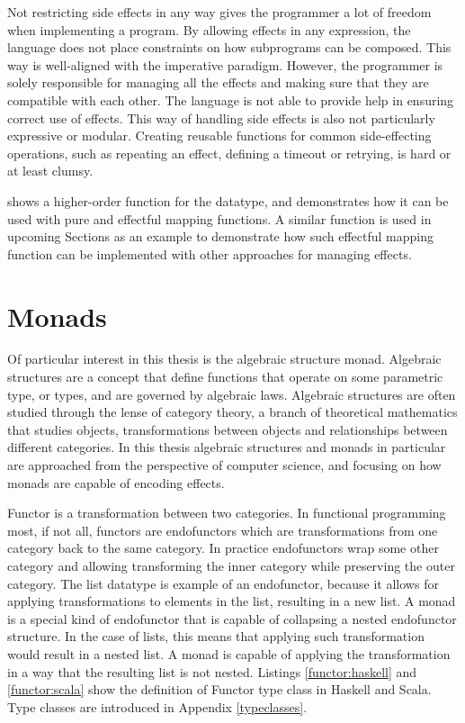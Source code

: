 Not restricting side effects in any way gives the programmer a lot of freedom when implementing a program. By allowing effects in any expression, the language does not place constraints on how subprograms can be composed. This way is well-aligned with the imperative paradigm. However, the programmer is solely responsible for managing all the effects and making sure that they are compatible with each other. The language is not able to provide help in ensuring correct use of effects. This way of handling side effects is also not particularly expressive or modular. Creating reusable functions for common side-effecting operations, such as repeating an effect, defining a timeout or retrying, is hard or at least clumsy.

 shows a higher-order function  for the  datatype, and demonstrates how it can be used with pure and effectful mapping functions. A similar function is used in upcoming Sections as an example to demonstrate how such effectful mapping function can be implemented with other approaches for managing effects.





\section{Monads} \label{monads}
Of particular interest in this thesis is the algebraic structure monad. Algebraic structures are a concept that define functions that operate on some parametric type, or types, and are governed by algebraic laws. Algebraic structures are often studied through the lense of category theory, a branch of theoretical mathematics that studies objects, transformations between objects and relationships between different categories. In this thesis algebraic structures and monads in particular are approached from the perspective of computer science, and focusing on how monads are capable of encoding effects.

Functor is a transformation between two categories. In functional programming most, if not all, functors are endofunctors which are transformations from one category back to the same category. In practice endofunctors wrap some other category and allowing transforming the inner category while preserving the outer category. The list datatype is example of an endofunctor, because it allows for applying transformations to elements in the list, resulting in a new list. A monad is a special kind of endofunctor that is capable of collapsing a nested endofunctor structure. In the case of lists, this means that applying such transformation would result in a nested list. A monad is capable of applying the transformation in a way that the resulting list is not nested. Listings \ref{functor:haskell} and \ref{functor:scala} show the definition of Functor type class in Haskell and Scala. Type classes are introduced in Appendix \ref{typeclasses}.

